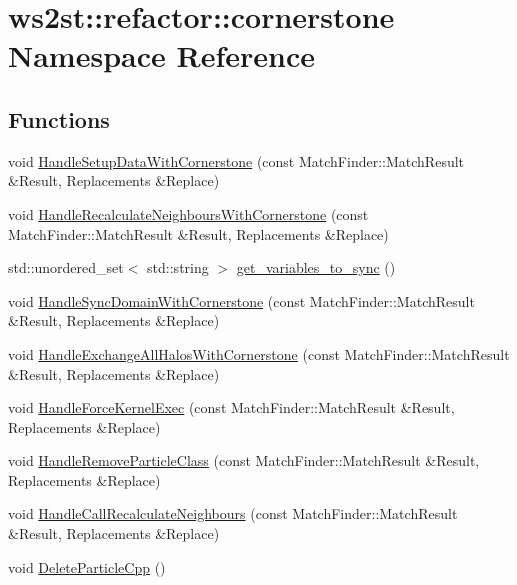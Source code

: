 \hypertarget{namespacews2st_1_1refactor_1_1cornerstone}{}\section{ws2st\+:\+:refactor\+:\+:cornerstone Namespace Reference}
\label{namespacews2st_1_1refactor_1_1cornerstone}
\subsection*{Functions}
\begin{DoxyCompactItemize}
\item 
void \mbox{\hyperlink{namespacews2st_1_1refactor_1_1cornerstone_aad716f4bb73a1049bcd55bf361651c0c}{Handle\+Setup\+Data\+With\+Cornerstone}} (const Match\+Finder\+::\+Match\+Result \&Result, Replacements \&Replace)
\item 
void \mbox{\hyperlink{namespacews2st_1_1refactor_1_1cornerstone_a1f5a9afc86f6aa77af85a4cc548c0036}{Handle\+Recalculate\+Neighbours\+With\+Cornerstone}} (const Match\+Finder\+::\+Match\+Result \&Result, Replacements \&Replace)
\item 
std\+::unordered\+\_\+set$<$ std\+::string $>$ \mbox{\hyperlink{namespacews2st_1_1refactor_1_1cornerstone_abde72b3c9eda2fd7a8ddbe86cff62dac}{get\+\_\+variables\+\_\+to\+\_\+sync}} ()
\item 
void \mbox{\hyperlink{namespacews2st_1_1refactor_1_1cornerstone_aa694f083de51ae2380956c1d8c0a952f}{Handle\+Sync\+Domain\+With\+Cornerstone}} (const Match\+Finder\+::\+Match\+Result \&Result, Replacements \&Replace)
\item 
void \mbox{\hyperlink{namespacews2st_1_1refactor_1_1cornerstone_ad6d327f35c362b237c3db61e0c894a14}{Handle\+Exchange\+All\+Halos\+With\+Cornerstone}} (const Match\+Finder\+::\+Match\+Result \&Result, Replacements \&Replace)
\item 
void \mbox{\hyperlink{namespacews2st_1_1refactor_1_1cornerstone_a364556efd044a2ecffce1dc8e88708d8}{Handle\+Force\+Kernel\+Exec}} (const Match\+Finder\+::\+Match\+Result \&Result, Replacements \&Replace)
\item 
void \mbox{\hyperlink{namespacews2st_1_1refactor_1_1cornerstone_a496182a726021e628c6bfaff0400a7f2}{Handle\+Remove\+Particle\+Class}} (const Match\+Finder\+::\+Match\+Result \&Result, Replacements \&Replace)
\item 
void \mbox{\hyperlink{namespacews2st_1_1refactor_1_1cornerstone_ac83e83dfaed9459d997fa73612a54eb4}{Handle\+Call\+Recalculate\+Neighbours}} (const Match\+Finder\+::\+Match\+Result \&Result, Replacements \&Replace)
\item 
void \mbox{\hyperlink{namespacews2st_1_1refactor_1_1cornerstone_ae99712ad3c7469ea6221650be9386ce7}{Delete\+Particle\+Cpp}} ()
\end{DoxyCompactItemize}
